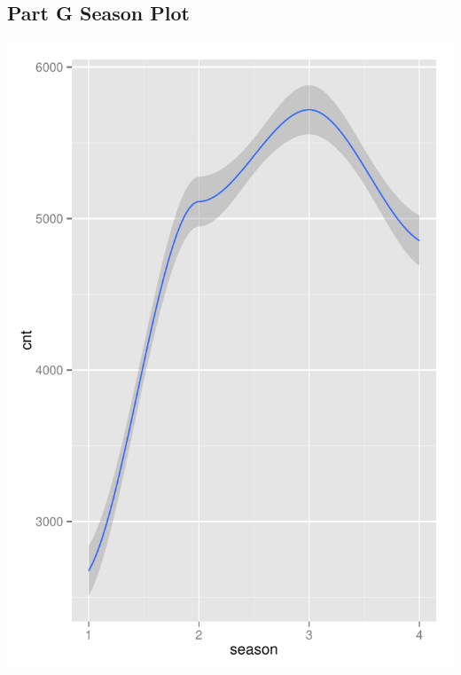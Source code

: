 \documentclass[11pt]{article}
\begin{document}
\subsection{Part G Season Plot}
\label{subsec:problem2gplotsSeason}
\includegraphics{Problem2G-Season.pdf}
\pagebreak
\end{document}
